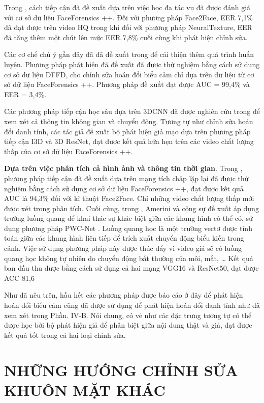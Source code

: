 \documentclass{article}
\begin{document}
Trong , cách tiếp cận đã đề xuất dựa trên việc học đa tác vụ đã được đánh giá với cơ sở dữ liệu FaceForensics ++. Đối với phương pháp Face2Face, EER 7,1\% đã đạt được trên video HQ trong khi đối với phương pháp NeuralTexture, EER đã tăng thêm một chút lên mức EER 7,8\% cuối cùng khi phát hiện chỉnh sửa.

Các cơ chế chú ý gần đây đã đã đề xuất trong  để cải thiện thêm quá trình huấn luyện. Phương pháp phát hiện đã đề xuất đã được thử nghiệm bằng cách sử dụng cơ sở dữ liệu DFFD, cho chỉnh sửa hoán đổi biểu cảm chỉ dựa trên dữ liệu từ cơ sở dữ liệu FaceForensics ++. Phương pháp đề xuất đạt được AUC = 99,4\% và EER = 3,4\%.

Các phương pháp tiếp cận học sâu dựa trên 3DCNN đã được nghiên cứu trong  để xem xét cả thông tin không gian và chuyển động. Tương tự như chỉnh sửa hoán đổi danh tính, các tác giả đề xuất bộ phát hiện giả mạo dựa trên phương pháp tiếp cận I3D và 3D ResNet, đạt được kết quả hứa hẹn trên các video chất lượng thấp của cơ sở dữ liệu FaceForensics ++.

\textbf{Dựa trên việc phân tích cả hình ảnh và thông tin thời gian}. Trong , phương pháp tiếp cận đã đề xuất dựa trên mạng tích chập lặp lại đã được thử nghiệm bằng cách sử dụng cơ sở dữ liệu FaceForensics ++, đạt được kết quả AUC là 94,3\% đối với kĩ thuật Face2Face. Chỉ những video chất lượng thấp mới được xét trong phân tích. Cuối cùng, trong , Amerini và cộng sự đề xuất áp dụng trường luồng quang để khai thác sự khác biệt giữa các khung hình có thể có, sử dụng phương pháp PWC-Net . Luồng quang học là một trường vectơ được tính toán giữa các khung hình liên tiếp để trích xuất chuyển động biểu kiến trong cảnh. Việc sử dụng phương pháp này được thúc đẩy vì video giả sẽ có luồng quang học không tự nhiên do chuyển động bất thường của môi, mắt, … Kết quả ban đầu thu được bằng cách sử dụng cả hai mạng VGG16 và ResNet50, đạt được ACC 81,6%

Như đã nêu trên, hầu hết các phương pháp được báo cáo ở đây để phát hiện hoán đổi biểu cảm cũng đã được sử dụng để phát hiện hoán đổi danh tính như đã xem xét trong Phần. IV-B. Nói chung, có vẻ như các đặc trưng tương tự có thể được học bởi bộ phát hiện giả để phân biệt giữa nội dung thật và giả, đạt được kết quả tốt trong cả hai loại chỉnh sửa.

\section{NHỮNG HƯỚNG CHỈNH SỬA KHUÔN MẶT KHÁC} \label{sec:7-other-direction}
\end{document}
